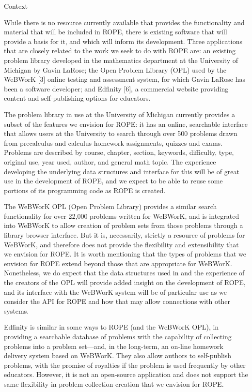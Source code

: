 \documentclass[11pt]{article}
\begin{document}
\begin{section}{Context}

While there is no resource currently available that provides the
functionality and material that will be included in ROPE, there is
existing software that will provide a basis for it, and which will inform
its development.  Three applications that are closely related to the work
we seek to do with ROPE are: an existing problem library developed in the
mathematics department at the University of Michigan by Gavin LaRose; the
Open Problem Library (OPL) used by the WeBWorK [3] %
online
testing and assessment system, for which Gavin LaRose has been a software
developer; and Edfinity [6], a commercial website providing content and
self-publishing options for educators.

The problem library in use at the University of Michigan currently
provides a subset of the features we envision for ROPE: it has an
online, searchable interface that allows users at the University to
search through over 500 problems drawn from precalculus and calculus
homework assignments, quizzes and exams.  Problems are described by
course, chapter, section, keywords, difficulty, type, original use, year
used, author, and general math topic.  The experience developing the
underlying data structures and interface for this will be of great use in
the development of ROPE, and we expect to be able to reuse some
portions of its programming code as ROPE is created.  

The WeBWorK OPL (Open Problem Library) provides a similar search
functionality for over 22,000 problems written for WeBWorK, and is
integrated into WeBWorK to allow creation of problem sets from those
problems through a library browser interface.  But it is, necessarily,
strictly a resource of problems for WeBWorK, and therefore does not
provide the flexibility and extensibility that we envision for ROPE.  It
is worth mentioning that the types of problems that we envision for ROPE
extend beyond those that are appropriate for WeBWorK.  Nonetheless, we do
expect that the data structures used in and the experience of the creators
of the OPL will provide added insight on the development of ROPE, and its
interface with the WeBWorK system will be of particular use as we consider
the API for ROPE and how that may allow connections with other systems.

Edfinity is similar in some ways to ROPE (and the WeBWorK OPL), in
providing a searchable database of problems with the capability of 
collecting problems into a problem set---and, in the long-term, an on-line
homework delivery system based on WeBWorK.  They also allow authors to 
self-publish problems, with the promise of royalties if the problem is
used frequently by other educators.  However, it is not an open-source
application and does not support the same flexibility in problem
collection creation that we envision for ROPE.


\end{section}
\end{document}
